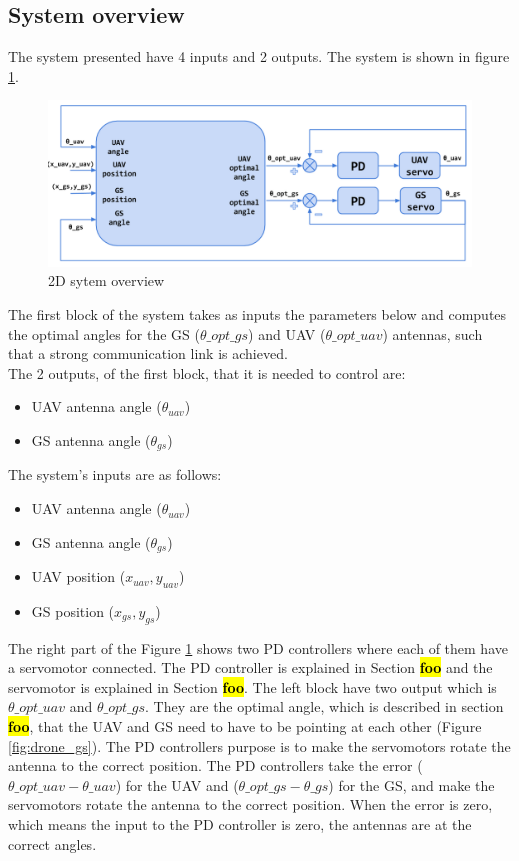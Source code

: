 \subsection{System overview}
The system presented have 4 inputs and 2 outputs. The system is shown in figure \ref{fig:2d_system}. 

\begin{figure}[h]
	\centering
	\includegraphics[scale=0.42]{figures/2d_system.png}
	\caption{2D sytem overview}
	\label{fig:2d_system}
\end{figure}
The first block of the system takes as inputs the parameters below and computes the optimal angles for the GS ($\theta\_opt\_gs$) and UAV ($\theta\_opt\_uav$) antennas, such that a strong communication link is achieved. \\

\noindent The 2 outputs, of the first block, that it is needed to control are:
\begin{itemize}
	\item UAV antenna angle ($\theta_{uav}$)
	\item GS antenna angle ($\theta_{gs}$)
\end{itemize}

\noindent The system's inputs are as follows:
\begin{itemize}
	\item UAV antenna angle ($\theta_{uav}$)
	\item GS antenna angle ($\theta_{gs}$)
	\item UAV position ($x_{uav},y_{uav}$)
	\item GS position ($x_{gs},y_{gs}$)
\end{itemize}   

The right part of the Figure \ref{fig:2d_system} shows two PD controllers where each of them have a servomotor connected. The PD controller is explained in Section \hl{\textbf{foo}}  and the servomotor is explained in Section \hl{\textbf{foo}}. The left block have two output which is $\theta\_opt\_uav$ and $\theta\_opt\_gs$. They are the optimal angle, which is described in section \hl{\textbf{foo}}, that the UAV and GS need to have to be pointing at each other (Figure \ref{fig:drone_gs}). The PD controllers purpose is to make the servomotors rotate the antenna to the correct position. The PD controllers take the error ($\theta\_opt\_uav - \theta\_uav$) for the UAV and ($\theta\_opt\_gs - \theta\_gs$) for the GS, and make the servomotors rotate the antenna to the correct position. When the error is zero, which means the input to the PD controller is zero, the antennas are at the correct angles.

